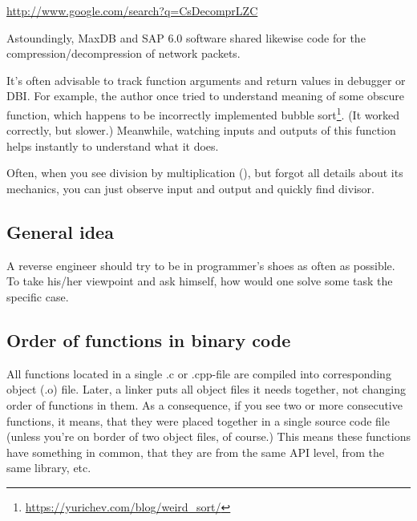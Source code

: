 \url{http://www.google.com/search?q=CsDecomprLZC}

Astoundingly, MaxDB and SAP 6.0 software shared likewise code for the compression/decompression of network packets.




It's often advisable to track function arguments and return values in debugger or \ac{DBI}.
For example, the author once tried to understand meaning of some obscure function, which happens to be incorrectly
implemented bubble sort\footnote{\url{https://yurichev.com/blog/weird_sort/}}.
(It worked correctly, but slower.)
Meanwhile, watching inputs and outputs of this function helps instantly to understand what it does.

Often, when you see division by multiplication (),
but forgot all details about its mechanics, you can just observe input
and output and quickly find divisor.














\subsection{General idea}

A reverse engineer should try to be in programmer's shoes as often as possible. 
To take his/her viewpoint and ask himself, how would one solve some task the specific case.

\subsection{Order of functions in binary code}

All functions located in a single .c or .cpp-file are compiled into corresponding object (.o) file.
Later, a linker puts all object files it needs together, not changing order of functions in them.
As a consequence, if you see two or more consecutive functions, it means, that they were placed together
in a single source code file (unless you're on border of two object files, of course.)
This means these functions have something in common, that they are from the same \ac{API} level, from the same library, etc.

